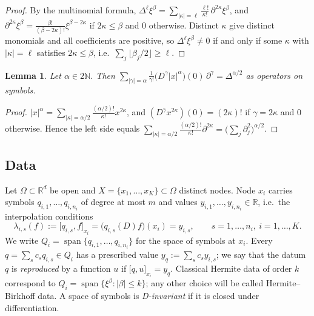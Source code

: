 \documentclass[12pt]{amsart}
\newtheorem{lemma}[theorem]{Lemma}
\theoremstyle{definition}
\theoremstyle{remark}
\newcommand{\R}{\mathbb{R}}
\newcommand{\N}{\mathbb{N}}
\newcommand{\fpz}[3]{\bigl[#1,#2\bigr]_{#3}}     %
\begin{document}
\begin{proof}
By the multinomial formula,
$\Delta^\ell\xi^\beta=\sum_{|\kappa|=\ell}\frac{\ell!}{\kappa!}\,\partial^{2\kappa}\xi^\beta$,
and $\partial^{2\kappa}\xi^\beta=\frac{\beta!}{(\beta-2\kappa)!}\xi^{\beta-2\kappa}$ if
$2\kappa\le\beta$ and $0$ otherwise. Distinct $\kappa$ give distinct monomials and all
coefficients are positive, so $\Delta^\ell\xi^\beta\ne0$ if and only if some $\kappa$ with
$|\kappa|=\ell$ satisfies $2\kappa\le\beta$, i.e.\ $\sum_j\lfloor\beta_j/2\rfloor\ge\ell$.
\end{proof}

\begin{lemma}\label{lem:normpower}
Let $\alpha\in2\N$. Then
$\sum_{|\gamma|=\alpha}\frac{1}{\gamma!}\bigl(D^\gamma|x|^\alpha\bigr)(0)\,\partial^\gamma=\Delta^{\alpha/2}$
as operators on symbols.
\end{lemma}

\begin{proof}
$|x|^\alpha=\sum_{|\kappa|=\alpha/2}\frac{(\alpha/2)!}{\kappa!}x^{2\kappa}$, and
$(D^\gamma x^{2\kappa})(0)=(2\kappa)!$ if $\gamma=2\kappa$ and $0$ otherwise. Hence the left side
equals $\sum_{|\kappa|=\alpha/2}\frac{(\alpha/2)!}{\kappa!}\partial^{2\kappa}
=\bigl(\sum_j\partial_j^2\bigr)^{\alpha/2}$.
\end{proof}

\subsection{Data}
Let $\Omega\subset\R^d$ be open and $X=\{x_1,\dots,x_K\}\subset\Omega$ distinct nodes. Node
$x_i$ carries symbols $q_{i,1},\dots,q_{i,n_i}$ of degree at most $m$ and values
$y_{i,1},\dots,y_{i,n_i}\in\R$, i.e.\ the interpolation conditions
\begin{equation}\label{eq:data}
  \lambda_{i,s}(f):=\fpz{q_{i,s}}{f}{x_i}=\bigl(q_{i,s}(D)f\bigr)(x_i)=y_{i,s},
  \qquad s=1,\dots,n_i,\ i=1,\dots,K.
\end{equation}
We write $Q_i=\operatorname{span}\{q_{i,1},\dots,q_{i,n_i}\}$ for the space of symbols at
$x_i$. Every $q=\sum_sc_sq_{i,s}\in Q_i$ has a prescribed value
$y_q:=\sum_sc_sy_{i,s}$; we say that the datum $q$ is \emph{reproduced} by a function $u$ if
$\fpz{q}{u}{x_i}=y_q$. Classical Hermite data of order $k$ correspond to
$Q_i=\operatorname{span}\{\xi^\beta:|\beta|\le k\}$; any other choice will be called
Hermite--Birkhoff data. A space of symbols is \emph{D-invariant} if it is closed under
differentiation.
\end{document}
